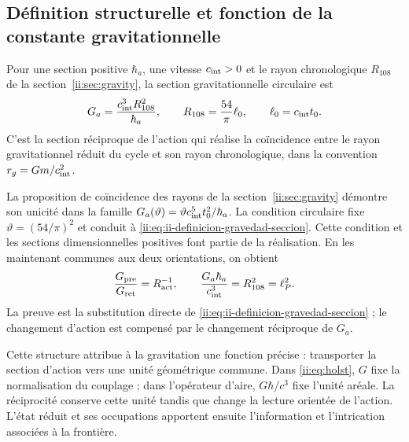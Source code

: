 \subsection{Définition structurelle et fonction de la constante gravitationnelle}
\label{ii:sec:ii-definicion-gravedad}

\begin{definition}
Pour une section positive \(\hbar_a\), une vitesse
\(c_{\rm int}>0\) et le rayon chronologique \(R_{108}\) de la
section~\ref{ii:sec:gravity}, la section gravitationnelle circulaire est
\begin{equation}
 G_a=\frac{c_{\rm int}^{3}R_{108}^{2}}{\hbar_a},
 \qquad R_{108}=\frac{54}{\pi}\ell_0,
 \qquad \ell_0=c_{\rm int}t_0.
 \label{ii:eq:ii-definicion-gravedad-seccion}
\end{equation}
C'est la section réciproque de l'action qui réalise la coïncidence
entre le rayon gravitationnel réduit du cycle et son rayon
chronologique, dans la convention \(r_g=Gm/c_{\rm int}^2\).
\end{definition}

La proposition de coïncidence des rayons de la
section~\ref{ii:sec:gravity} démontre son unicité dans la famille
\(G_a(\vartheta)=\vartheta c_{\rm int}^{5}t_0^2/\hbar_a\).
La condition circulaire fixe \(\vartheta=(54/\pi)^2\) et conduit
à \eqref{ii:eq:ii-definicion-gravedad-seccion}. Cette condition et les
sections dimensionnelles positives font partie de la réalisation.
En les maintenant communes aux deux orientations, on obtient
\begin{equation}
 \frac{G_{\mathrm{pre}}}{G_{\mathrm{ret}}}
 =R_{\mathrm{act}}^{-1},
 \qquad
 \frac{G_a\hbar_a}{c_{\rm int}^{3}}
 =R_{108}^{2}=\ell_P^2.
 \label{ii:eq:ii-definicion-gravedad-area}
\end{equation}
La preuve est la substitution directe de
\eqref{ii:eq:ii-definicion-gravedad-seccion} ; le changement d'action
est compensé par le changement réciproque de \(G_a\).

Cette structure attribue à la gravitation une fonction précise :
transporter la section d'action vers une unité géométrique commune.
Dans \eqref{ii:eq:holst}, \(G\) fixe la normalisation du couplage ;
dans l'opérateur d'aire, \(G\hbar/c^3\) fixe l'unité aréale.
La réciprocité conserve cette unité tandis que change la lecture
orientée de l'action. L'état réduit et ses occupations apportent
ensuite l'information et l'intrication associées à la frontière.

